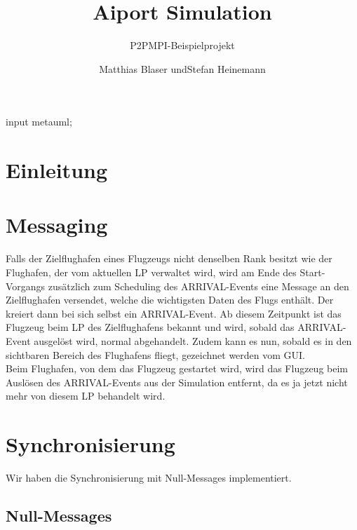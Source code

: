 \documentclass[oneside,DIV12,BCOR0.5cm,bibliography=totoc]{template}
\begin{document}
\begin{empfile}
\begin{empcmds}
input metauml;
\end{empcmds}


\title{Aiport Simulation}
\subtitle{P2PMPI-Beispielprojekt}

\author{Matthias Blaser undStefan Heinemann }

\maketitle


\section{Einleitung}

\section{Messaging}

Falls der Zielflughafen eines Flugzeugs nicht denselben Rank besitzt
wie der Flughafen, der vom aktuellen LP verwaltet wird, wird am
Ende des Start-Vorgangs zusätzlich zum Scheduling des ARRIVAL-Events 
eine Message an den Zielflughafen versendet, welche die wichtigsten
Daten des Flugs enthält. Der kreiert dann bei sich selbst ein 
ARRIVAL-Event. Ab diesem Zeitpunkt ist das Flugzeug beim LP des 
Zielflughafens bekannt und wird, sobald das ARRIVAL-Event
ausgelöst wird, normal abgehandelt. Zudem kann es nun, sobald es
in den sichtbaren Bereich des Flughafens fliegt, gezeichnet werden
vom GUI.\\

Beim Flughafen, von dem das Flugzeug gestartet wird, wird das Flugzeug
beim Auslösen des ARRIVAL-Events aus der Simulation entfernt, da es
ja jetzt nicht mehr von diesem LP behandelt wird.\\

\section{Synchronisierung}

Wir haben die Synchronisierung mit Null-Messages implementiert.

\subsection{Null-Messages}


\end{empfile}
\end{document}
